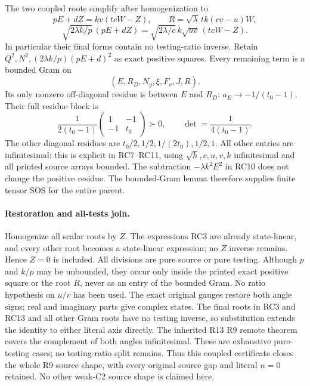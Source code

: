 The two coupled roots simplify after homogenization to
\[
 pE+dZ=kv(tcW-Z),\qquad
 R=\sqrt\lambda\,tk(cv-u)W,
\]
\[
 \sqrt{2\lambda k/p}\,(pE+dZ)
       =\sqrt{2\lambda/c}\,k\sqrt{uv}\,(tcW-Z).
 \tag{RC13}
\]
In particular their final forms contain no testing-ratio inverse.
Retain $Q^2,N^2,(2\lambda k/p)(pE+d)^2$ as exact positive squares.
Every remaining term is a bounded Gram on
\[
              (E,R_D,N_y,\xi,F_v,J,R).
\]
Its only nonzero off-diagonal residue is between $E$ and $R_D$:
$a_E\to-1/(t_0-1)$. Their full residue block is
\[
 \frac1{2(t_0-1)}
 \begin{pmatrix}1&-1\\-1&t_0\end{pmatrix}\succ0,
 \qquad \det=\frac1{4(t_0-1)}.
 \tag{RC12}
\]
The other diagonal residues are $t_0/2,1/2,1/(2t_0),1/2,1$.
All other entries are infinitesimal: this is explicit in RC7--RC11,
using $\sqrt h,c,u,v,k$ infinitesimal and all printed source arrays
bounded. The subtraction $-\lambda k^2E^2$ in RC10 does not change
the positive residue. The bounded-Gram lemma therefore supplies
finite tensor SOS for the entire parent.

\paragraph{Restoration and all-tests join.}
Homogenize all scalar roots by $Z$. The expressions RC3 are already
state-linear, and every other root becomes a state-linear expression;
no $Z$ inverse remains. Hence $Z=0$ is included. All divisions are
pure source or pure testing. Although $p$ and $k/p$ may be unbounded,
they occur only inside the printed exact positive square or the root
$R$, never as an entry of the bounded Gram. No ratio hypothesis on
$u/v$ has been used. The exact original gauges restore both
angle signs; real and imaginary parts give complex states. The final roots in RC3 and RC13 and all other Gram roots have no
testing inverse, so substitution extends the identity to either literal
axis directly. The inherited R13 R9 remote theorem covers the complement
of both angles infinitesimal.
These are exhaustive pure-testing cases; no testing-ratio split remains.
Thus this coupled certificate closes the whole R9 source shape,
with every original source gap and literal $n=0$ retained. No other
weak-C2 source shape is claimed here.
